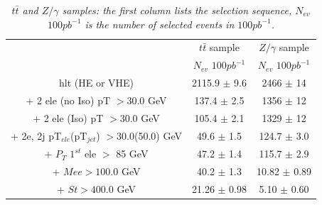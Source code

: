 \documentclass{cmspaper}
\begin{document}
\begin{linenumbers}
\begin{table}[htbp]
\begin{center}
\begin{tabular}{|c| |c|c|}
\hline
\hline
 & $t\bar{t}$ sample  & $Z/\gamma$ sample\\
 & $N_{ev}$ $100pb^{-1}$ & $N_{ev}$ $100pb^{-1}$ \\
  
\hline
\hline

hlt (HE or VHE) &2115.9 $\pm$ 9.6 & 2466 $\pm$ 14 \\
+ 2 ele (no Iso) pT $>30.0$ GeV &137.4 $\pm$ 2.5& 1356 $\pm$ 12 \\
+ 2 ele (Iso) pT $>30.0$ GeV &105.4 $\pm$ 2.1& 1329 $\pm$ 12  \\
+ 2e, 2j pT$_{ele}$(pT$_{jet}$) $>$30.0(50.0) GeV &49.6 $\pm$ 1.5& 124.7 $\pm$ 3.0\\
+ $P_{T}$ $1^{st}$ ele $>$ 85 GeV &47.2 $\pm$ 1.4& 115.7 $\pm$ 2.9\\
+ $Mee >100.0$ GeV&40.2 $\pm$ 1.3& 10.82 $\pm$ 0.89 \\
+ $St >400.0$ GeV &21.26 $\pm$ 0.98 & 5.10 $\pm$ 0.60 \\
\hline
\end{tabular}
\end{center}
\caption{\small \sl $t\bar{t}$ and $Z/\gamma$ samples: the first column lists the selection sequence, $N_{ev}$ $100pb^{-1}$ is the number of selected events in $100pb^{-1}$.}
\label{tab:selection_effic_ttbar}
\end{table}




\end{linenumbers}
\end{document}
